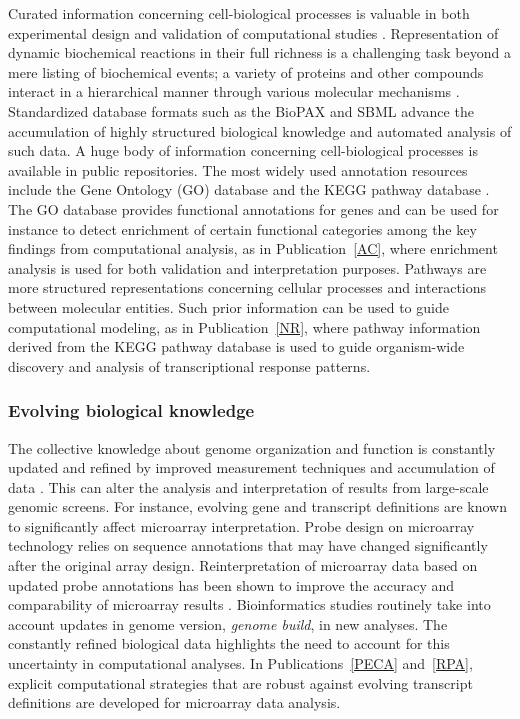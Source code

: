 Curated information concerning cell-biological processes is valuable
in both experimental design and validation of computational studies
\citep{Blake04}. Representation of dynamic biochemical reactions in
their full richness is a challenging task beyond a mere listing of
biochemical events; a variety of proteins and other compounds interact
in a hierarchical manner through various molecular mechanisms
\citep{Hartwell99, Przytycka2010}. Standardized database formats such
as the BioPAX \citep{BioPAX05} and SBML \citep{Stromback05} advance
the accumulation of highly structured biological knowledge and
automated analysis of such data. A huge body of information concerning
cell-biological processes is available in public repositories. The
most widely used annotation resources include the Gene Ontology (GO)
database \citep{Ashburner00} and the KEGG pathway database
\citep{Kanehisa2010}. The GO database provides functional annotations
for genes and can be used for instance to detect enrichment of certain
functional categories among the key findings from computational
analysis, as in Publication~\ref{AC}, where enrichment analysis is
used for both validation and interpretation purposes.  Pathways are
more structured representations concerning cellular processes and
interactions between molecular entities. Such prior information can be
used to guide computational modeling, as in Publication~\ref{NR},
where pathway information derived from the KEGG pathway database is
used to guide organism-wide discovery and analysis of transcriptional
response patterns.

\subsubsection{Evolving biological knowledge}

The collective knowledge about genome organization and function is
constantly updated and refined by improved measurement techniques and
accumulation of data \citep{Sebat07}. This can alter the analysis and
interpretation of results from large-scale genomic screens. For
instance, evolving gene and transcript definitions are known to
significantly affect microarray interpretation. Probe design on
microarray technology relies on sequence annotations that may have
changed significantly after the original array design.
Reinterpretation of microarray data based on updated probe annotations
has been shown to improve the accuracy and comparability of microarray
results \citep{Dai05, Hwang04, Mecham04b}. Bioinformatics studies
routinely take into account updates in genome version, {\it genome
  build}, in new analyses. The constantly refined biological data
highlights the need to account for this uncertainty in computational
analyses. In Publications~\ref{PECA} and~\ref{RPA}, explicit
computational strategies that are robust against evolving transcript
definitions are developed for microarray data analysis.

